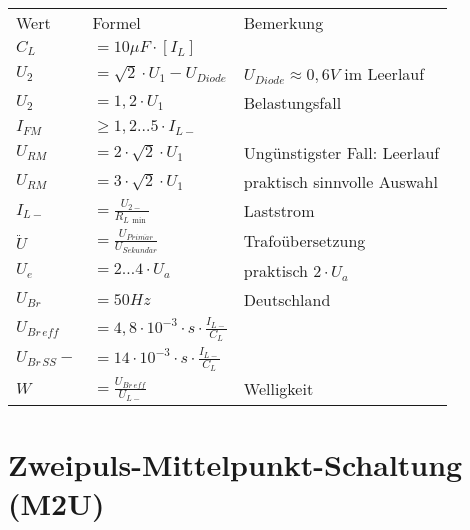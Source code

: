     \begin{table}[H]
        \begin{tabularx}{\columnwidth}{l l l}
            Wert            & Formel                                            & Bemerkung \\
            $C_L$           & $=10\mu F\cdot [I_L]$                             & \\
            $U_2$           & $= \sqrt{2}\cdot U_1-U_{Diode}$                   & $U_{Diode}\approx 0,6V$ im Leerlauf \\
            $U_2$           & $= 1,2\cdot U_1$                                  & Belastungsfall \\
            $I_{FM}$        & $\geq1,2\dots 5\cdot I_{L-}$                      & \\
            $U_{RM}$        & $=2\cdot \sqrt{2}\cdot U_1$                       & Ungünstigster Fall: Leerlauf \\
            $U_{RM}$        & $=3\cdot \sqrt{2}\cdot U_1$                       & praktisch sinnvolle Auswahl \\
            $I_{L-}$        & $=\frac{U_{2-}}{R_{L\,\min}}$                     & Laststrom \\
            $\ddot{U}$      & $=\frac{U_{Prim\ddot{a}r}}{U_{Sekund\ddot{a}r}}$  & Trafoübersetzung \\
            $U_e$           & $=2\dots 4\cdot U_a$                              & praktisch $2\cdot U_a$ \\
            $U_{Br}$        & $=50Hz$                                           & Deutschland \\ %
            $U_{Br\,eff}$   & $=4,8\cdot 10^{-3}\cdot s\cdot\frac{I_{L-}}{C_L}$ & \\
            $U_{Br\,SS}-$   & $=14\cdot 10^{-3}\cdot s\cdot\frac{I_{L-}}{C_L}$  & \\
            $W$             & $=\frac{U_{Br\,eff}}{U_{L-}}$                     & Welligkeit \\ %
        \end{tabularx}
    \end{table}
\section{Zweipuls-Mittelpunkt-Schaltung (M2U)}\label{sec:zweipuls-mittelpunkt-schaltung} %

